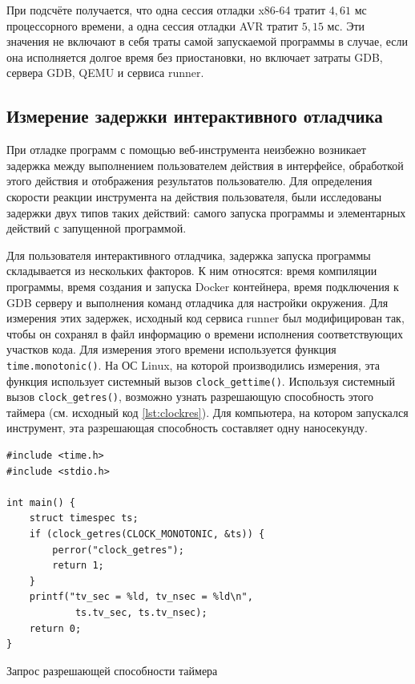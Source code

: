 \documentclass[a4paper,article,14pt]{extarticle}
\begin{document}
При подсчёте получается, что одна сессия отладки x86-64 тратит $4{,}61$ мс процессорного времени, а одна сессия отладки AVR тратит $5{,}15$ мс. Эти значения не включают в себя траты самой запускаемой программы в случае, если она исполняется долгое время без приостановки, но включает затраты GDB, сервера GDB, QEMU и сервиса runner.

\subsection{Измерение задержки интерактивного отладчика}

При отладке программ с помощью веб-инструмента неизбежно возникает задержка между выполнением пользователем действия в интерфейсе, обработкой этого действия и отображения результатов пользователю. Для определения скорости реакции инструмента на действия пользователя, были исследованы задержки двух типов таких действий: самого запуска программы и элементарных действий с запущенной программой.

Для пользователя интерактивного отладчика, задержка запуска программы складывается из нескольких факторов. К ним относятся: время компиляции программы, время создания и запуска Docker контейнера, время подключения к GDB серверу и выполнения команд отладчика для настройки окружения. Для измерения этих задержек, исходный код сервиса runner был модифицирован так, чтобы он сохранял в файл информацию о времени исполнения соответствующих участков кода. Для измерения этого времени используется функция \texttt{time.monotonic()}. На ОС Linux, на которой производились измерения, эта функция использует системный вызов \texttt{clock\_gettime()}. Используя системный вызов \texttt{clock\_getres()}, возможно узнать разрешающую способность этого таймера (см. исходный код \ref{lst:clockres}). Для компьютера, на котором запускался инструмент, эта разрешающая способность составляет одну наносекунду.

\begin{listing}[ht]
\begin{verbatim}
#include <time.h>
#include <stdio.h>

int main() {
    struct timespec ts;
    if (clock_getres(CLOCK_MONOTONIC, &ts)) {
        perror("clock_getres");
        return 1;
    }
    printf("tv_sec = %ld, tv_nsec = %ld\n",
            ts.tv_sec, ts.tv_nsec);
    return 0;
}
\end{verbatim}
\caption{Запрос разрешающей способности таймера}
\label{lst:clockres}
\end{listing}
\end{document}
